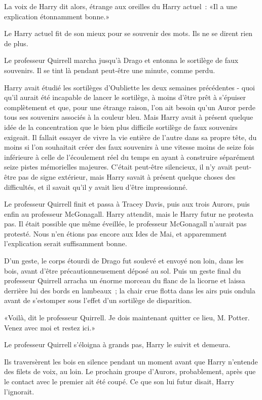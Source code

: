 La voix de Harry dit alors, étrange aux oreilles du Harry actuel~: «Il a une explication étonnamment bonne.»

Le Harry actuel fit de son mieux pour se souvenir des mots. Ils ne se dirent rien de plus.

Le professeur Quirrell marcha jusqu'à Drago et entonna le sortilège de faux souvenirs. Il se tint là pendant peut-être une minute, comme perdu.

Harry avait étudié les sortilèges d'Oubliette les deux semaines précédentes - quoi qu'il aurait été incapable de lancer le sortilège, à moins d'être prêt à s'épuiser complètement et que, pour une étrange raison, l'on ait besoin qu'un Auror perde tous ses souvenirs associés à la couleur bleu. Mais Harry avait à présent quelque idée de la concentration que le bien plus difficile sortilège de faux souvenirs exigeait. Il fallait essayer de vivre la vie entière de l'autre dans sa propre tête, du moins si l'on souhaitait créer des faux souvenirs à une vitesse moins de seize fois inférieure à celle de l'écoulement réel du temps en ayant à construire séparément seize pistes mémorielles majeures. C'était peut-être silencieux, il n'y avait peut-être pas de signe extérieur, mais Harry savait à présent quelque choses des difficultés, et il savait qu'il y avait lieu d'être impressionné.

Le professeur Quirrell finit et passa à Tracey Davis, puis aux trois Aurors, puis enfin au professeur McGonagall. Harry attendit, mais le Harry futur ne protesta pas. Il était possible que même éveillée, le professeur McGonagall n'aurait pas protesté. Nous n'en étions pas encore aux Ides de Mai, et apparemment l'explication serait suffisamment bonne.

D'un geste, le corps étourdi de Drago fut soulevé et envoyé non loin, dans les bois, avant d'être précautionneusement déposé au sol. Puis un geste final du professeur Quirrell arracha un énorme morceau du flanc de la licorne et laissa derrière lui des bords en lambeaux~; la chair crue flotta dans les airs puis ondula avant de s'estomper sous l'effet d'un sortilège de disparition.

«Voilà, dit le professeur Quirrell. Je dois maintenant quitter ce lieu, M. Potter. Venez avec moi et restez ici.»

Le professeur Quirrell s'éloigna à grands pas, Harry le suivit et demeura.

Ils traversèrent les bois en silence pendant un moment avant que Harry n'entende des filets de voix, au loin. Le prochain groupe d'Aurors, probablement, après que le contact avec le premier ait été coupé. Ce que son lui futur disait, Harry l'ignorait.

